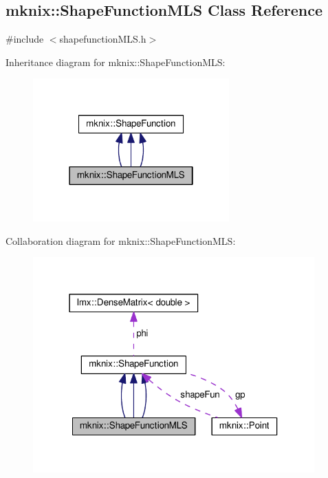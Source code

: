 \hypertarget{classmknix_1_1_shape_function_m_l_s}{}\subsection{mknix\+:\+:Shape\+Function\+M\+L\+S Class Reference}
\label{classmknix_1_1_shape_function_m_l_s}


{\ttfamily \#include $<$shapefunction\+M\+L\+S.\+h$>$}



Inheritance diagram for mknix\+:\+:Shape\+Function\+M\+L\+S\+:\nopagebreak
\begin{figure}[H]
\begin{center}
\leavevmode
\includegraphics[width=214pt]{d3/d21/classmknix_1_1_shape_function_m_l_s__inherit__graph}
\end{center}
\end{figure}


Collaboration diagram for mknix\+:\+:Shape\+Function\+M\+L\+S\+:\nopagebreak
\begin{figure}[H]
\begin{center}
\leavevmode
\includegraphics[width=307pt]{d7/d18/classmknix_1_1_shape_function_m_l_s__coll__graph}
\end{center}
\end{figure}

